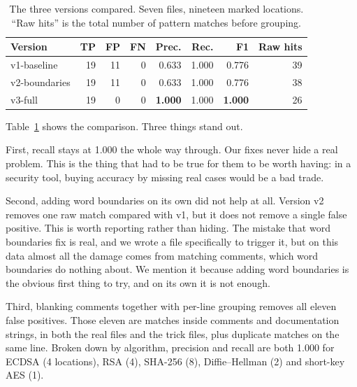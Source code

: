 \documentclass[runningheads]{llncs}
\begin{document}
\begin{table}[t]
\centering
\caption{The three versions compared. Seven files, nineteen marked locations.
``Raw hits'' is the total number of pattern matches before grouping.}
\label{tab:ablation}
\begin{tabular}{@{}lrrrrrrr@{}}
\toprule
\textbf{Version} & \textbf{TP} & \textbf{FP} & \textbf{FN} &
\textbf{Prec.} & \textbf{Rec.} & \textbf{F1} & \textbf{Raw hits} \\
\midrule
v1-baseline   & 19 & 11 & 0 & 0.633 & 1.000 & 0.776 & 39 \\
v2-boundaries & 19 & 11 & 0 & 0.633 & 1.000 & 0.776 & 38 \\
v3-full       & 19 &  0 & 0 & \textbf{1.000} & 1.000 & \textbf{1.000} & 26 \\
\bottomrule
\end{tabular}
\end{table}

Table~\ref{tab:ablation} shows the comparison. Three things stand out.

First, recall stays at 1.000 the whole way through. Our fixes never hide a real
problem. This is the thing that had to be true for them to be worth having: in a
security tool, buying accuracy by missing real cases would be a bad trade.

Second, adding word boundaries on its own did not help at all. Version v2
removes one raw match compared with v1, but it does not remove a single false
positive. This is worth reporting rather than hiding. The mistake that word
boundaries fix is real, and we wrote a file specifically to trigger it, but on
this data almost all the damage comes from matching comments, which word
boundaries do nothing about. We mention it because adding word boundaries is the
obvious first thing to try, and on its own it is not enough.

Third, blanking comments together with per-line grouping removes all eleven
false positives. Those eleven are matches inside comments and documentation
strings, in both the real files and the trick files, plus duplicate matches on
the same line. Broken down by algorithm, precision and recall are both 1.000 for
ECDSA (4 locations), RSA (4), SHA-256 (8), Diffie--Hellman (2) and short-key AES
(1).
\end{document}
